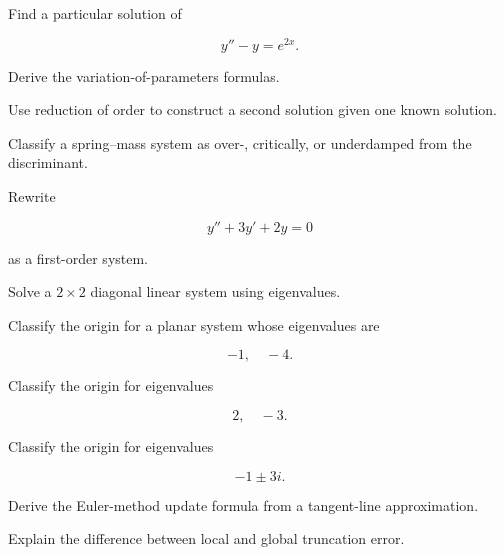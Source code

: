 \begin{exercise}[3]
Find a particular solution of

\[
y''-y=e^{2x}.
\]
\end{exercise}

\begin{exercise}[3]
Derive the variation-of-parameters formulas.
\end{exercise}

\begin{exercise}[3]
Use reduction of order to construct a second solution given one known
solution.
\end{exercise}

\begin{exercise}[3]
Classify a spring--mass system as over-, critically, or underdamped from
the discriminant.
\end{exercise}

\begin{exercise}[3]
Rewrite

\[
y''+3y'+2y=0
\]

as a first-order system.
\end{exercise}

\begin{exercise}[3]
Solve a \(2\times2\) diagonal linear system using eigenvalues.
\end{exercise}

\begin{exercise}[3]
Classify the origin for a planar system whose eigenvalues are

\[
-1,
\quad
-4.
\]
\end{exercise}

\begin{exercise}[3]
Classify the origin for eigenvalues

\[
2,
\quad
-3.
\]
\end{exercise}

\begin{exercise}[3]
Classify the origin for eigenvalues

\[
-1\pm3i.
\]
\end{exercise}

\begin{exercise}[3]
Derive the Euler-method update formula from a tangent-line approximation.
\end{exercise}

\begin{exercise}[3]
Explain the difference between local and global truncation error.
\end{exercise}

